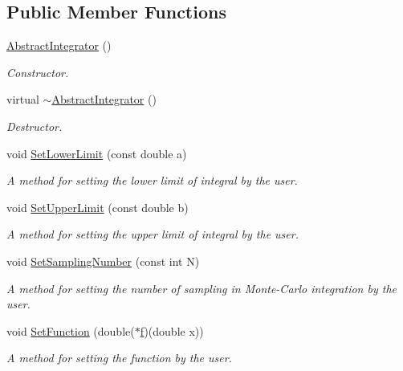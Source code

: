 \subsection*{Public Member Functions}
\begin{DoxyCompactItemize}
\item 
\hyperlink{class_abstract_integrator_aa88168bae2057a179c9ecc2ba9639f61}{Abstract\+Integrator} ()
\begin{DoxyCompactList}\small\item\em Constructor. \end{DoxyCompactList}\item 
virtual \hyperlink{class_abstract_integrator_addc528450d3f1d6e5d2cbd81e7d545e0}{$\sim$\+Abstract\+Integrator} ()
\begin{DoxyCompactList}\small\item\em Destructor. \end{DoxyCompactList}\item 
void \hyperlink{class_abstract_integrator_aea1949bda48ee6f4501475e8da26aaeb}{Set\+Lower\+Limit} (const double a)
\begin{DoxyCompactList}\small\item\em A method for setting the lower limit of integral by the user. \end{DoxyCompactList}\item 
void \hyperlink{class_abstract_integrator_a341070bf2dca9e2ac113d388e6d06556}{Set\+Upper\+Limit} (const double b)
\begin{DoxyCompactList}\small\item\em A method for setting the upper limit of integral by the user. \end{DoxyCompactList}\item 
void \hyperlink{class_abstract_integrator_a48c0b007c4b18e4a229f014bb0ccf9c0}{Set\+Sampling\+Number} (const int N)
\begin{DoxyCompactList}\small\item\em A method for setting the number of sampling in Monte-\/\+Carlo integration by the user. \end{DoxyCompactList}\item 
void \hyperlink{class_abstract_integrator_a9350f10f351d5b58c6aa8e581325ff4f}{Set\+Function} (double($\ast$\hyperlink{main_8cpp_a3de2b7b41a8e4b07da05298510d17ed2}{f})(double x))
\begin{DoxyCompactList}\small\item\em A method for setting the function by the user. \end{DoxyCompactList}\item 

\end{DoxyCompactItemize}
